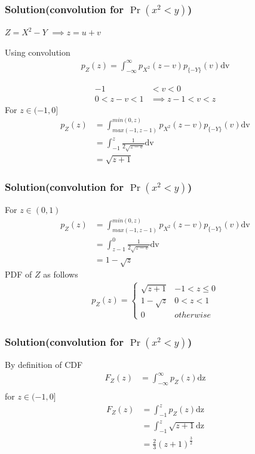 \documentclass{beamer}
\begin{document}
\begin{frame}
\frametitle{Solution(convolution  for $\Pr(x^2<y)$)}
$Z=X^2-Y$ $\implies  z=u+v$\\
\begin{block}{Using convolution}
\begin{align}
p_Z(z)=\int_{- \infty}^{\infty} p_{X^2}(z-v)p_{\{-Y\}}(v) \mathrm{dv} \label{pz}
\end{align}
\end{block}
\begin{align}
-1 &< v < 0 \\
0 < z-v < 1 &\implies z-1 <v <z 
\end{align}
For $z \in (-1,0]$
\begin{align}
p_Z(z)&=\int_{max(-1,z-1)}^{min(0,z)} p_{X^2}(z-v)p_{\{-Y\}}(v) \mathrm{dv}\\
      &= \int_{-1}^{z}\frac{1}{2 \sqrt{z-v}}\mathrm{dv}\\
      &=\sqrt{z+1}
\end{align}
\end{frame}
\begin{frame}
\frametitle{Solution(convolution for $\Pr(x^2<y)$)}
For $z \in (0,1)$
\begin{align}
p_Z(z)&=\int_{max(-1,z-1)}^{min(0,z)} p_{X^2}(z-v)p_{\{-Y\}}(v) \mathrm{dv}\\
      &= \int_{z-1}^{0}\frac{1}{2 \sqrt{z-v}}\mathrm{dv}\\
      &=1-\sqrt{z}
\end{align}
 PDF of $Z$ as follows
\begin{align}
p_{Z}(z)  = 
\begin{cases}
      \sqrt{z+1} & -1 < z \leq 0 \\
      1-\sqrt{z} & 0 < z <1 \\
      0 & otherwise 
\end{cases} \label{13}
\end{align}
\end{frame}
\begin{frame}
\frametitle{Solution(convolution for $\Pr(x^2<y)$)}
By definition of CDF
\begin{align}
F_Z(z)&=\int_{-\infty}^{\infty} p_{Z}(z) \mathrm{dz}\\
\end{align}
for $z \in (-1,0]$
\begin{align}
F_Z(z)&=\int_{-1}^{z} p_{Z}(z) \mathrm{dz}\\
      &=\int_{-1}^{z} \sqrt{z+1} \mathrm{dz}\\
      &= \frac{2}{3}{(z+1)}^\frac{3}{2}
\end{align}
\end{frame}
\end{document}
